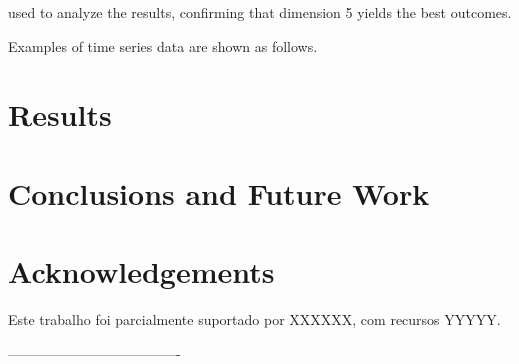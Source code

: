 \documentclass[a0,portrait]{a0poster}
\begin{document}
\begin{mdframed}[style=MyFrame]
\begin{multicols}{2}
used to analyze the results, confirming that dimension 5 yields the best outcomes.

Examples of time series data are shown as follows.



\section{Results}\label{section4}


\section{Conclusions and Future Work}

\section*{Acknowledgements}
%
Este trabalho foi parcialmente suportado por XXXXXX, com recursos  YYYYY.

%
%

-------------------------------------
\end{multicols}
\begin{center}
\color{SteelBlue}{New Zealand Statistical Association 2024 Conference}
\end{center}
\end{mdframed}
\end{document}
